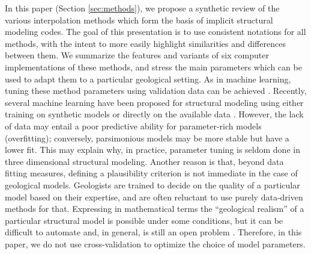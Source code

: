 \documentclass[preprint]{ring20}
\begin{document}
In this paper (Section \ref{sec:methods}), we propose a synthetic review of the various interpolation methods which form the basis of implicit structural modeling codes. The goal of this presentation is to use consistent notations for all methods, with the intent to more easily highlight similarities and differences between them. We summarize the features and variants of six computer implementations of these methods, and stress the main parameters which can be used to adapt them to a particular geological setting. As in machine learning, tuning these method parameters using validation data can be achieved \citep{Goncalves2017CG}. Recently, several machine learning have been proposed for structural modeling using either training on synthetic models \citep{Bi2022GMD} or directly on the available data \citep{Hillier2021MG}. However, the lack of data may entail a poor predictive ability for parameter-rich models (overfitting); conversely, parsimonious models may be more stable but have a lower fit. This may explain why, in practice, parameter tuning is seldom done in three dimensional structural modeling. Another reason is that, beyond data fitting measures, defining a plausibility criterion is not immediate in the case of geological models. Geologists are trained to decide on the quality of a particular model based on their expertise, and are often reluctant to use purely data-driven methods for that. Expressing in mathematical terms the ``geological realism'' of a particular structural model is possible under some conditions, but it can be difficult to automate and, in general, is still an open problem \citep{Caumon2010MG,Jessell2010T}. Therefore, in this paper, we do not use cross-validation to optimize the choice of model parameters.
\end{document}

